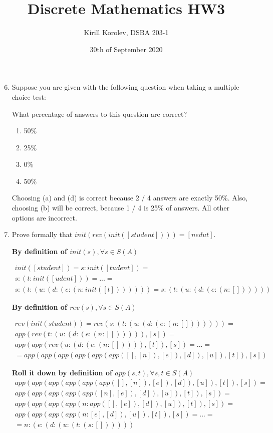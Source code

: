 \documentclass{article}
\title{Discrete Mathematics HW3}
\author{Kirill Korolev, DSBA 203-1}
\date{30th of September 2020}
\begin{document}
\maketitle

\begin{enumerate}
\setcounter{enumi}{5}

\item Suppose you are given with the following question when taking a multiple choice test:

What percentage of answers to this question are correct?

\begin{enumerate}
\item 50\%
\item 25\%
\item 0\%
\item 50\%
\end{enumerate}

Choosing (a) and (d) is correct because 2 / 4 answers are exactly 50\%. Also, choosing (b) will be correct, because 1 / 4 is 25\% of answers. All other options are incorrect.

\item Prove formally that $init(rev(init([student]))) = [nedut]$.

\textbf{By definition of $init(s), \forall s \in S(A)$}

\begin{align*}
init([student]) = s : init([tudent]) =\\ s : (t : init([udent])) = ... =\\ s : (t : (u : (d : (e : (n : init([t])))))) = s : (t : (u : (d : (e : (n : [])))))
\end{align*}

\textbf{By definition of $rev(s), \forall s \in S(A)$}

\begin{align*}
rev(init(student)) = rev(s : (t : (u : (d : (e : (n : [])))))) =\\
app(rev(t : (u : (d : (e : (n : []))))), [s]) =\\ app(app(rev(u : (d : (e : (n : [])))), [t]), [s]) = ... = \\ = app(app(app(app(app(app([], [n]), [e]), [d]), [u]), [t]), [s]) 
\end{align*}

\textbf{Roll it down by definition of $app(s, t), \forall s, t \in S(A)$}
\begin{align*}
app(app(app(app(app(app([], [n]), [e]), [d]), [u]), [t]), [s]) =\\
app(app(app(app(app([n], [e]), [d]), [u]), [t]), [s]) = \\
app(app(app(app(n: app([], [e]), [d]), [u]), [t]), [s]) = \\
app(app(app(app(n: [e], [d]), [u]), [t]), [s]) = ... = \\
= n : (e : (d : (u : (t : (s : [])))))
\end{align*}


\end{enumerate}
\end{document}
